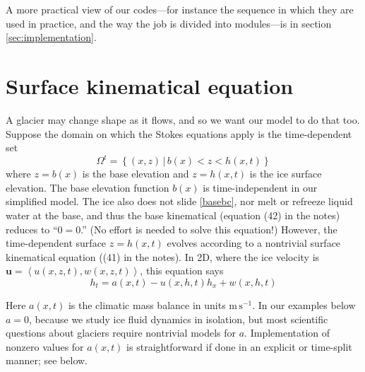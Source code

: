 \documentclass[letterpaper,final,12pt,reqno]{amsart}
\newcommand{\bu}{\mathbf{u}}
\begin{document}
A more practical view of our codes---for instance the sequence in which they are used in practice, and the way the job is divided into modules---is in section \ref{sec:implementation}.


\section{Surface kinematical equation} \label{sec:kinematical}

A glacier may change shape as it flows, and so we want our model to do that too.  Suppose the domain on which the Stokes equations apply is the time-dependent set
\begin{equation}
\Omega^t = \left\{(x,z)\,\big|\, b(x) < z < h(x,t)\right\}  \label{Omegat}
\end{equation}
where $z=b(x)$ is the base elevation and $z=h(x,t)$ is the ice surface elevation.  The base elevation function $b(x)$ is time-independent in our simplified model.  The ice also does not slide \eqref{basebc}, nor melt or refreeze liquid water at the base, and thus the base kinematical (equation (42) in the notes) reduces to ``$0=0$.''  (No effort is needed to solve this equation!)  However, the time-dependent surface $z=h(x,t)$ evolves according to a nontrivial surface kinematical equation ((41) in the notes).  In 2D, where the ice velocity is $\bu=\left<u(x,z,t),w(x,z,t)\right>$, this equation says
\begin{equation}
h_t = a(x,t) - u(x,h,t) h_x + w(x,h,t) \label{surfacekinematical}
\end{equation}

Here $a(x,t)$ is the climatic mass balance in units $\text{m}\,\text{s}^{-1}$.  In our examples below $a=0$, because we study ice fluid dynamics in isolation, but most scientific questions about glaciers require nontrivial models for $a$.  Implementation of nonzero values for $a(x,t)$ is straightforward if done in an explicit or time-split manner; see below.
\end{document}
